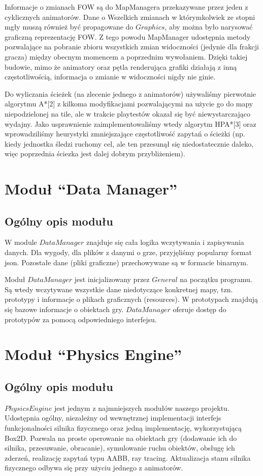\documentclass[licencjacka]{pracamgr}
\begin{document}
    Informacje o zmianach FOW są do MapManagera przekazywane przez jeden z cyklicznych animatorów. Dane o Wszelkich
    zmianach w którymkolwiek ze stopni mgły muszą również być propagowane do $Graphics$, aby można było narysować
    graficzną reprezentację FOW. Z tego powodu MapManager udostępnia metody pozwalające na pobranie zbioru wszystkich
    zmian widoczności (jedynie dla frakcji gracza) między obecnym momencem a poprzednim wywołaniem. Dzięki takiej
    budowie, mimo że animatory oraz pętla renderująca grafiki działają z inną częstotliwością, informacja o zmianie w
    widoczności nigdy nie ginie.

    Do wyliczania ścieżek (na zlecenie jednego z animatorów) używaliśmy pierwotnie algorytmu A*[2] z kilkoma
    modyfikacjami pozwalającymi na użycie go do mapy niepodzielonej na tile, ale w trakcie playtestów okazał się być
    niewystarczająco wydajny. Jako usprawnienie zaimplementowaliśmy wtedy algorytm HPA*[3] oraz wprowadziliśmy
    heurystyki zmniejszające częstotliwość zapytań o ścieżki (np. kiedy jednostka śledzi ruchomy cel, ale ten przesunął
    się niedostatecznie daleko, więc poprzednia ściezka jest dalej dobrym przybliżeniem).

  \section{Moduł ``Data Manager''}
    \subsection{Ogólny opis modułu}
      W module $DataManager$ znajduje się cała logika wczytywania i zapisywania danych. Dla wygody, dla plików z
      danymi o grze, przyjęliśmy popularny format json. Pozostałe dane (pliki graficzne) przechowywane są w formacie
      binarnym.

      Moduł $DataManager$ jest inicjalizowany przez $General$ na początku programu. Są wtedy wczytywane wszystkie dane
      niedotyczące konkretnej mapy, tzn. prototypy i informacje o plikach graficznych (resources). W prototypach
      znajdują się bazowe informacje o obiektach gry. $DataManager$ oferuje dostęp do prototypów za pomocą
      odpowiedniego interfejsu.

  \section{Moduł ``Physics Engine''}
    \subsection{Ogólny opis modułu}
    $PhysicsEngine$ jest jednym z najmniejszych modułów naszego projektu. Udostępnia ogólny, niezależny od
    wewnętrznej implementacji interfejs funkcjonalności silnika fizycznego oraz jedną implementację, wykorzystującą Box2D.
    Pozwala na proste operowanie na obiektach gry (dodawanie ich do silnika, przesuwanie, obracanie), symulowanie ruchu obiektów,
    obsługę ich zderzeń, realizację zapytań typu AABB, ray tracing. Aktualizacja stanu silnika fizycznego odbywa się przy użyciu jednego
    z animatorów.
\end{document}
